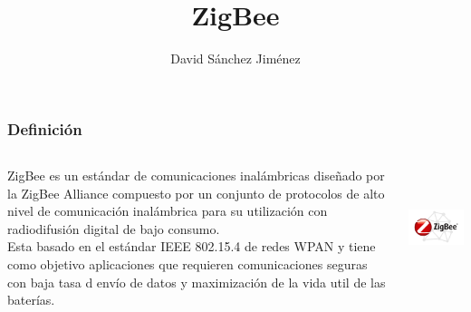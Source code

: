 \documentclass[10pt,a4paper,spanish]{beamer}
\title{ZigBee}
\author{David Sánchez Jiménez}
\begin{document}
\frame{\titlepage}

\begin{frame}
	\frametitle{Definición}
	\begin{columns}
		\begin{column}{6cm}
			ZigBee es un estándar de comunicaciones inalámbricas diseñado por la ZigBee Alliance compuesto por un conjunto de protocolos de alto nivel de comunicación inalámbrica para su utilización con radiodifusión digital de bajo consumo. \\

			\vspace{0.5cm}
			Esta basado en el estándar IEEE 802.15.4 de redes WPAN y tiene como objetivo aplicaciones que requieren comunicaciones seguras con baja tasa d envío de datos y maximización de la vida util de las baterías.
		\end{column}
		\begin{column}{5cm}
			\begin{center}
				\includegraphics[height=3.5cm]{imagenes/1.png}
			\end{center}
		\end{column}
	\end{columns}
\end{frame}
\end{document}
